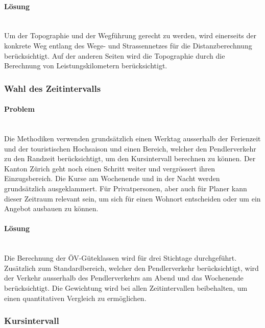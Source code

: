 \paragraph{Lösung}~\\
Um der Topographie und der Wegführung gerecht zu werden, wird einerseits der konkrete Weg entlang des Wege- und Strassennetzes für die Distanzberechnung berücksichtigt.
Auf der anderen Seiten wird die Topographie durch die Berechnung von \gls{Leistungskilometer}n berücksichtigt.

\subsubsection{Wahl des Zeitintervalls}
\label{Verbesserungsmöglichkeiten:Wahl des Zeitintervalls}

\paragraph{Problem}~\\
Die Methodiken verwenden grundsätzlich einen Werktag ausserhalb der Ferienzeit und der touristischen Hochsaison und einen Bereich, welcher den Pendlerverkehr zu den Randzeit berücksichtigt, um den Kursintervall berechnen zu können.
Der Kanton Zürich geht noch einen Schritt weiter und vergrössert ihren Einzugsbereich.
Die Kurse am Wochenende und in der Nacht werden grundsätzlich ausgeklammert.
Für Privatpersonen, aber auch für Planer kann dieser Zeitraum relevant sein, um sich für einen Wohnort entscheiden oder um ein Angebot ausbauen zu können.

\paragraph{Lösung}~\\
Die Berechnung der \acs{ÖV}-Güteklassen wird für drei Stichtage durchgeführt.
Zusätzlich zum Standardbereich, welcher den Pendlerverkehr berücksichtigt, wird der Verkehr ausserhalb des Pendlerverkehrs am Abend und das Wochenende berücksichtigt.
Die Gewichtung wird bei allen Zeitintervallen beibehalten, um einen quantitativen Vergleich zu ermöglichen.

\subsubsection{Kursintervall}
\label{Verbesserungsmöglichkeiten:Kursintervall}

